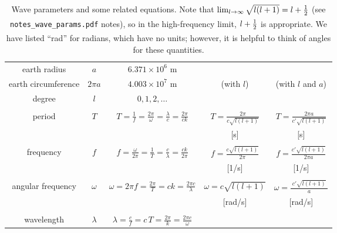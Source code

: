\begin{table}[h]
\caption[Wave parameters and some related equations]
{{
Wave parameters and some related equations.
Note that $\lim_{l\rightarrow \infty } \sqrt{l(l+1)} = l + \hlf$ (see {\tt notes\_wave\_params.pdf} notes), so in the high-frequency limit, $l + \hlf$ is appropriate.
We have listed ``rad'' for radians, which have no units; however, it is helpful to think of angles for these quantities.
\label{tab:waveparm}
}}
\hspace{-1cm}
\begin{tabular}{||c|c|c|c|c||}
\hline
%
earth radius & \hspace{10pt} $a$ \hspace{10pt}
& $6.371 \times 10^6$ m & & \\
\cline{1-3}
earth circumference & $2\pi a$ & $4.003 \times 10^7$ m & (with $l$) & (with $l$ and $a$)  \\
\cline{1-3}
%
degree	& $l$ & $0,1,2,\ldots$ & & \\
\hline
%
& & & & \\
period		& $T$
& $T = \frac{1}{f} = \frac{2\pi}{\omega} = \frac{\lambda}{c} = \frac{2\pi}{c k}$ 
& $T = \frac{2\pi}{c\sqrt{l(l+1)}}$ 
& $T = \frac{2\pi a}{c'\sqrt{l(l+1)}}$
\\
& & & [s] & [s] \\ \hline
%
& & & & \\
frequency	& $f$
& $f = \frac{\omega}{2\pi} = \frac{1}{T} = \frac{c}{\lambda} = \frac{ck}{2\pi}$ 
& $f = \frac{c\sqrt{l(l+1)}}{2\pi}$
& $f = \frac{c'\sqrt{l(l+1)}}{2\pi a}$
\\
& & & [1/s] & [1/s] \\ \hline
%
& & & & \\
angular frequency	& $\omega$		
& $\omega = 2\pi f = \frac{2\pi}{T} = ck = \frac{2\pi c}{\lambda}$
& $\omega = c\sqrt{l(l+1)}$
& $\omega = \frac{\;c'\sqrt{l(l+1)}\;}{a}$
\\
& & & [rad/s] & [rad/s] \\ \hline\hline
%
& & & & \\
wavelength	& $\lambda$		
& $\lambda = \frac{c}{f} = c\,T = \frac{2\pi}{k} = \frac{2\pi c}{\omega}$

\end{tabular}
\end{table}
